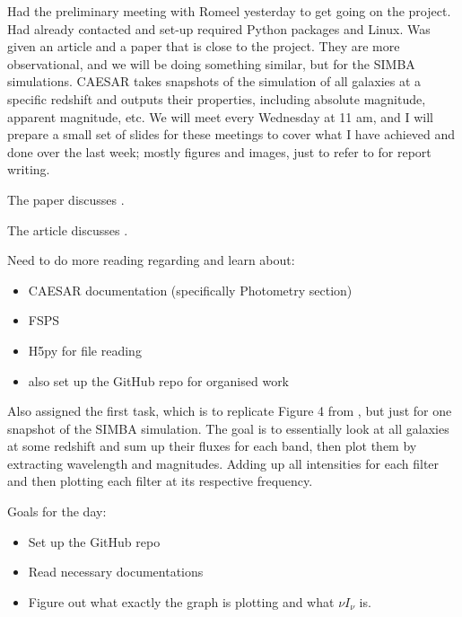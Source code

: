 \documentclass[a4paper, 11pt, oneside]{researchjournal} %
\author{Siddhant Pujni\\ %
The University of Edinburgh}
\begin{document}

Had the preliminary meeting with Romeel yesterday to get going on the project. Had already contacted and set-up required Python packages and Linux. Was given an article and a paper that is close to the project. They are more observational, and we will be doing something similar, but for the SIMBA simulations. CAESAR takes snapshots of the simulation of all galaxies at a specific redshift and outputs their properties, including absolute magnitude, apparent magnitude, etc. We will meet every Wednesday at 11 am, and I will prepare a small set of slides for these meetings to cover what I have achieved and done over the last week; mostly figures and images, just to refer to for report writing. 

\vspace{0.5em}

The paper discusses \parencite{hillSpectrumUniverse2018}.

\vspace{0.5em}

The article discusses \parencite{bakerWhatColorUniverse2021}.

Need to do more reading regarding and learn about:
\begin{itemize}
\itemsep -6pt {}
    \item CAESAR documentation (specifically Photometry section)
    \item FSPS
    \item H5py for file reading
    \item also set up the GitHub repo for organised work
\end{itemize}

Also assigned the first task, which is to replicate Figure 4 from \parencite{hillSpectrumUniverse2018}, but just for one snapshot of the SIMBA simulation. The goal is to essentially look at all galaxies at some redshift and sum up their fluxes for each band, then plot them by extracting wavelength and magnitudes. Adding up all intensities for each filter and then plotting each filter at its respective frequency.

Goals for the day:
\begin{itemize}
\itemsep -6pt {}
    \item Set up the GitHub repo 
    \item Read necessary documentations
    \item Figure out what exactly the graph is plotting and what $\nu I_{\nu}$ is. 
\end{itemize}
\end{document}
